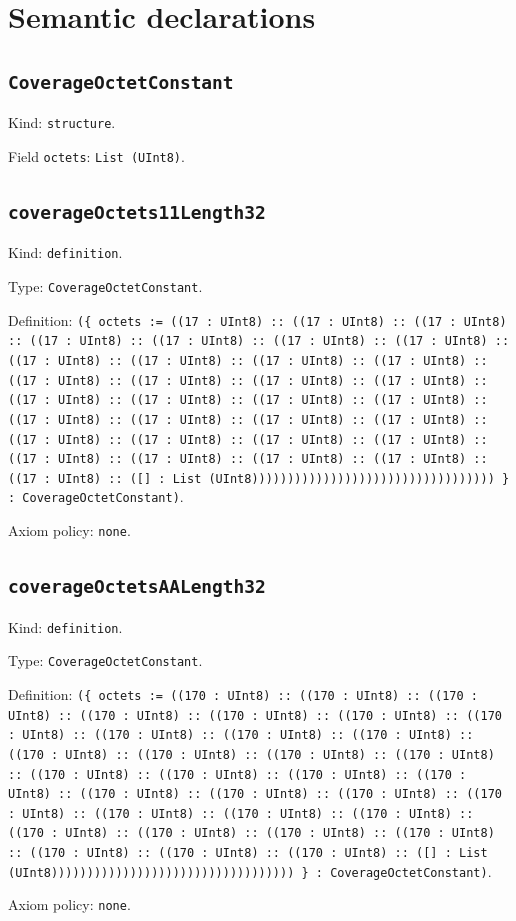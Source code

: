 \documentclass[11pt]{article}
\begin{document}
\section*{Semantic declarations}
\subsection*{\texttt{CoverageOctetConstant}}
\noindent Kind: \texttt{structure}.\par
\noindent Field \texttt{octets}: \texttt{List (UInt8)}.\par
\subsection*{\texttt{coverageOctets11Length32}}
\noindent Kind: \texttt{definition}.\par
\noindent Type: \texttt{CoverageOctetConstant}.\par
\noindent Definition: \texttt{(\{ octets := ((17 : UInt8) :: ((17 : UInt8) :: ((17 : UInt8) :: ((17 : UInt8) :: ((17 : UInt8) :: ((17 : UInt8) :: ((17 : UInt8) :: ((17 : UInt8) :: ((17 : UInt8) :: ((17 : UInt8) :: ((17 : UInt8) :: ((17 : UInt8) :: ((17 : UInt8) :: ((17 : UInt8) :: ((17 : UInt8) :: ((17 : UInt8) :: ((17 : UInt8) :: ((17 : UInt8) :: ((17 : UInt8) :: ((17 : UInt8) :: ((17 : UInt8) :: ((17 : UInt8) :: ((17 : UInt8) :: ((17 : UInt8) :: ((17 : UInt8) :: ((17 : UInt8) :: ((17 : UInt8) :: ((17 : UInt8) :: ((17 : UInt8) :: ((17 : UInt8) :: ((17 : UInt8) :: ((17 : UInt8) :: ([] : List (UInt8)))))))))))))))))))))))))))))))))) \} : CoverageOctetConstant)}.\par
\noindent Axiom policy: \texttt{none}.\par
\subsection*{\texttt{coverageOctetsAALength32}}
\noindent Kind: \texttt{definition}.\par
\noindent Type: \texttt{CoverageOctetConstant}.\par
\noindent Definition: \texttt{(\{ octets := ((170 : UInt8) :: ((170 : UInt8) :: ((170 : UInt8) :: ((170 : UInt8) :: ((170 : UInt8) :: ((170 : UInt8) :: ((170 : UInt8) :: ((170 : UInt8) :: ((170 : UInt8) :: ((170 : UInt8) :: ((170 : UInt8) :: ((170 : UInt8) :: ((170 : UInt8) :: ((170 : UInt8) :: ((170 : UInt8) :: ((170 : UInt8) :: ((170 : UInt8) :: ((170 : UInt8) :: ((170 : UInt8) :: ((170 : UInt8) :: ((170 : UInt8) :: ((170 : UInt8) :: ((170 : UInt8) :: ((170 : UInt8) :: ((170 : UInt8) :: ((170 : UInt8) :: ((170 : UInt8) :: ((170 : UInt8) :: ((170 : UInt8) :: ((170 : UInt8) :: ((170 : UInt8) :: ((170 : UInt8) :: ([] : List (UInt8)))))))))))))))))))))))))))))))))) \} : CoverageOctetConstant)}.\par
\noindent Axiom policy: \texttt{none}.\par
\end{document}
